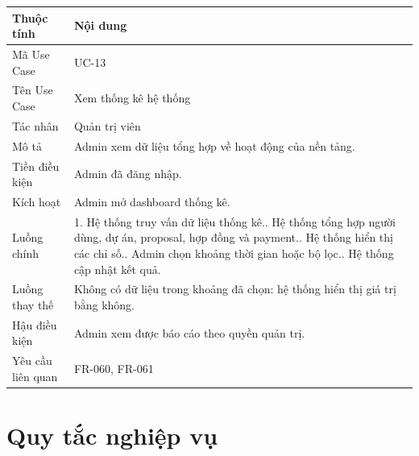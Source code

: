 \begin{longtable}{|p{3.5cm}|p{10.2cm}|}
\hline
\textbf{Thuộc tính} & \textbf{Nội dung} \\ \hline
Mã Use Case & UC-13 \\ \hline
Tên Use Case & Xem thống kê hệ thống \\ \hline
Tác nhân & Quản trị viên \\ \hline
Mô tả & Admin xem dữ liệu tổng hợp về hoạt động của nền tảng. \\ \hline
Tiền điều kiện & Admin đã đăng nhập. \\ \hline
Kích hoạt & Admin mở dashboard thống kê. \\ \hline
Luồng chính &
1. Hệ thống truy vấn dữ liệu thống kê.\newline
2. Hệ thống tổng hợp người dùng, dự án, proposal, hợp đồng và payment.\newline
3. Hệ thống hiển thị các chỉ số.\newline
4. Admin chọn khoảng thời gian hoặc bộ lọc.\newline
5. Hệ thống cập nhật kết quả. \\ \hline
Luồng thay thế & Không có dữ liệu trong khoảng đã chọn: hệ thống hiển thị giá trị bằng không. \\ \hline
Hậu điều kiện & Admin xem được báo cáo theo quyền quản trị. \\ \hline
Yêu cầu liên quan & FR-060, FR-061 \\ \hline
\end{longtable}

\section{Quy tắc nghiệp vụ}
\label{sec:business-rules}

